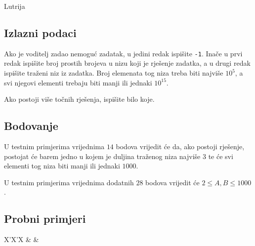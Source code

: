 \begin{statement}[
  problempoints=70,
  timelimit=1 sekunda,
  memorylimit=512 MiB,
]{Lutrija}
\subsection*{Izlazni podaci}
Ako je voditelj zadao nemoguć zadatak, u jedini redak ispišite \texttt{-1}.
Inače u prvi redak ispišite broj prostih brojeva u nizu koji je rješenje
zadatka, a u drugi redak ispišite traženi niz iz zadatka. Broj elemenata tog
niza treba biti najviše $10^5$, a svi njegovi elementi trebaju biti manji ili
jednaki $10^{15}$.

Ako postoji više točnih rješenja, ispišite bilo koje.

\subsection*{Bodovanje}
U testnim primjerima vrijednima $14$ bodova vrijedit će da, ako postoji rješenje,
postojat će barem jedno u kojem je duljina traženog niza najviše $3$ te će svi
elementi tog niza biti manji ili jednaki $1000$.

U testnim primjerima vrijednima dodatnih $28$ bodova vrijedit će
$2 \le A, B \le 1000$.

\subsection*{Probni primjeri}
\begin{tabularx}{\textwidth}{X'X'X}
 &
 &
\end{tabularx}

\end{statement}

